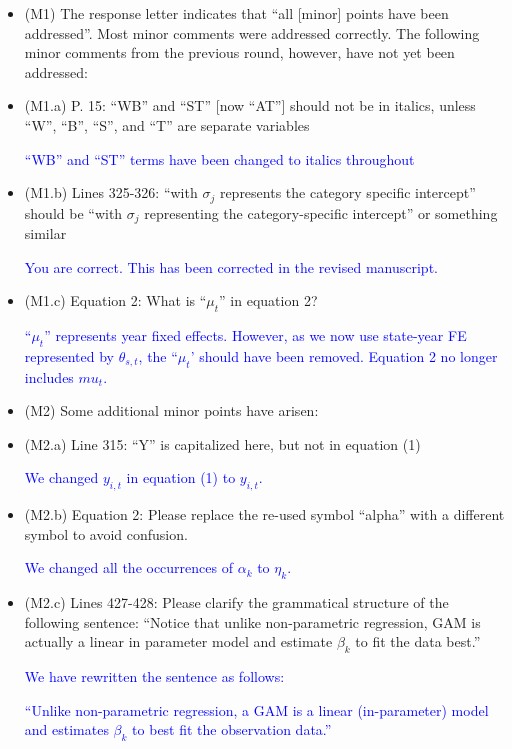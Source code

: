 \documentclass[
]{article}
\begin{document}
\begin{itemize}

\item (M1) The response letter indicates that ``all [minor] points have been addressed''. Most minor comments were addressed correctly. The following minor comments from the previous round, however, have not yet been addressed:

\item (M1.a) P. 15: ``WB'' and ``ST'' [now ``AT''] should not be in italics, unless ``W'', ``B'', ``S'', and ``T'' are separate variables

\textcolor{blue}{``WB'' and ``ST'' terms have been changed to italics throughout}

\item (M1.b) Lines 325-326: ``with $\sigma_j$ represents the category specific intercept'' should be ``with $\sigma_j$ representing the category-specific intercept'' or something similar

\textcolor{blue}{You are correct. This has been corrected in the revised manuscript.}

\item (M1.c) Equation 2: What is ``$\mu_t$'' in equation 2?

\textcolor{blue}{``$\mu_t$'' represents year fixed effects. However, as we now use state-year FE represented by $\theta_{s,t}$, the ``$\mu_t$' should have been removed. Equation 2 no longer includes $mu_t$.}

\item (M2) Some additional minor points have arisen:

\item (M2.a) Line 315: ``Y'' is capitalized here, but not in equation (1)

\textcolor{blue}{We changed $y_{i,t}$ in equation (1) to $y_{i,t}$.}

\item (M2.b) Equation 2: Please replace the re-used symbol ``alpha'' with a different symbol to avoid confusion.

\textcolor{blue}{We changed all the occurrences of $\alpha_{k}$ to $\eta_{k}$.}

\item (M2.c) Lines 427-428: Please clarify the grammatical structure of the following sentence: ``Notice that unlike non-parametric regression, GAM is actually a linear in parameter model and estimate $\beta_k$ to fit the data best.''

\textcolor{blue}{We have rewritten the sentence as follows:}

\textcolor{blue}{``Unlike non-parametric regression, a GAM is a linear (in-parameter) model and estimates $\beta_k$ to best fit the observation data.''}

\end{itemize}
\end{document}
